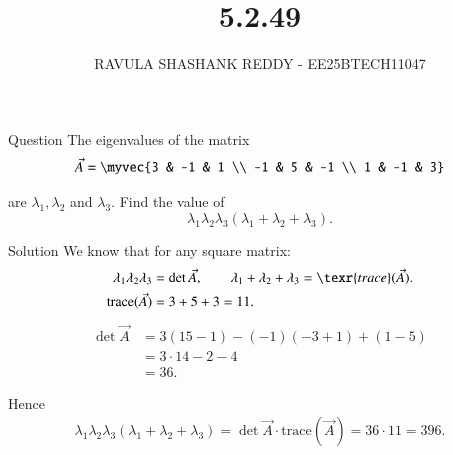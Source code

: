 \documentclass{beamer}
\title %
{5.2.49}
\author %
{RAVULA SHASHANK REDDY - EE25BTECH11047}
\begin{document}
	
	
	\frame{\titlepage}
	\begin{frame}{Question}
    The eigenvalues of the matrix 
\[
\vec{A} = \myvec{3 & -1 & 1 \\ -1 & 5 & -1 \\ 1 & -1 & 3}
\]

are $\lambda_1, \lambda_2$ and $\lambda_3$. Find the value of 
\[
\lambda_1 \lambda_2 \lambda_3 (\lambda_1 + \lambda_2 + \lambda_3).
\]
\end{frame}
\begin{frame}{Solution}
    We know that for any square matrix:
\begin{align}
\lambda_1 \lambda_2 \lambda_3 &= \det \vec{A}, \qquad 
\lambda_1 + \lambda_2 + \lambda_3 = \texr{trace} (\vec{A}).\\
 \text{trace}(\vec{A}) &= 3 + 5 + 3 = 11.
\end{align}
\begin{align}
\det \vec{A} 
&= 3(15-1) - (-1)(-3+1) + (1-5) \\[1mm]
&= 3\cdot 14 - 2 - 4 \\[1mm]
&= 36.
\end{align}

Hence
\begin{align}
\lambda_1 \lambda_2 \lambda_3 (\lambda_1 + \lambda_2 + \lambda_3) = \det \vec{A} \cdot \text{trace} (\vec{A}) = 36 \cdot 11 = 396.
\end{align}
\end{frame}
\end{document}
